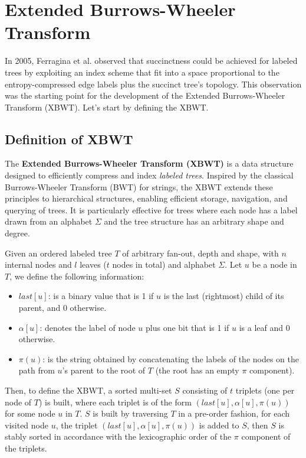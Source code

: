 \chapter{Extended Burrows-Wheeler Transform}

In 2005, Ferragina et al. \cite{ferragina2009compressing} observed that succinctness could be achieved for labeled trees by exploiting an index scheme that fit into a space proportional to the entropy-compressed edge labels plus the succinct tree's topology. This observation was the starting point for the development of the Extended Burrows-Wheeler Transform (XBWT). Let's start by defining the XBWT.

\section{Definition of XBWT}
The \textbf{Extended Burrows-Wheeler Transform (XBWT)} is a data structure designed to efficiently compress and index \emph{labeled trees}. Inspired by the classical Burrows-Wheeler Transform (BWT) \cite{burrows1994block} for strings, the XBWT extends these principles to hierarchical structures, enabling efficient storage, navigation, and querying of trees. It is particularly effective for trees where each node has a label drawn from an alphabet $\Sigma$ and the tree structure has an arbitrary shape and degree.

Given an ordered labeled tree $T$ of arbitrary fan-out, depth and shape, with $n$ internal nodes and $l$ leaves ($t$ nodes in total) and alphabet $\Sigma$. Let $u$ be a node in $T$, we define the following information:
\begin{itemize}
    \item $last[u]$: is a binary value that is 1 if $u$ is the last (rightmost) child of its parent, and 0 otherwise.
    \item $\alpha[u]$: denotes the label of node $u$ plus one bit that is 1 if $u$ is a leaf and 0 otherwise.
    \item $\pi(u)$: is the string obtained by concatenating the labels of the nodes on the path from $u$'s parent to the root of $T$ (the root has an empty $\pi$ component).
\end{itemize}

Then, to define the XBWT, a sorted multi-set $S$ consisting of $t$ triplets (one per node of $T$) is built, where each triplet is of the form $(last[u], \alpha[u], \pi(u))$ for some node $u$ in $T$. $S$ is built by traversing $T$ in a pre-order fashion, for each visited node $u$, the triplet $(last[u], \alpha[u], \pi(u))$ is added to $S$, then $S$ is stably sorted in accordance with the lexicographic order of the $\pi$ component of the triplets.

